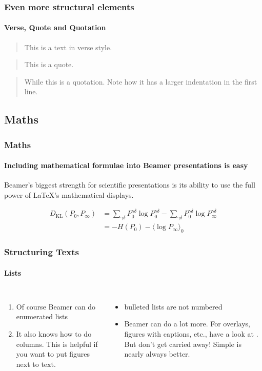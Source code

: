 \documentclass{beamer}
\begin{document}
\begin{frame}
\frametitle{Even more structural elements}
\framesubtitle{Verse, Quote and Quotation}

\begin{verse}
This is a text in verse style.
\end{verse}

\begin{quote}
This is a quote.
\end{quote}

\begin{quotation}
While this is a quotation. Note how it has a larger indentation in the first line.
\end{quotation}

\end{frame}


\subsection{Maths}
\begin{frame}
\frametitle{Maths}
\framesubtitle{Including mathematical formulae into Beamer presentations is easy}

Beamer's biggest strength for scientific presentations is its ability to use the full power of \LaTeX's mathematical displays.

\begin{equation}
	\begin{aligned}
	D_{\text{KL}}(P_0, P_\infty) &= \sum_{\gamma\delta} P_0 ^{\gamma\delta} \log P_0 ^{\gamma\delta} - \sum_{\gamma\delta} P_0 ^{\gamma\delta} \log P_\infty ^{\gamma\delta}\\
					&= - H (P_0) - \langle \log P_\infty \rangle_0
	\label{eq:5}
	\end{aligned}
\end{equation}

\end{frame}

\begin{frame}\frametitle{Structuring Texts}
\framesubtitle{Lists}

\begin{columns}
\begin{enumerate}
	\item Of course Beamer can do enumerated lists
	\item It also knows how to do columns. This is helpful if you want to put figures next to text.
\end{enumerate}
\begin{itemize}
	\item bulleted lists are not numbered
	\item Beamer can do a lot more. For overlays, figures with captions, etc., have a look at \cite{Beamer}. But don't get carried away! Simple is nearly always better.
\end{itemize}

\end{columns}
\end{frame}
\end{document}
